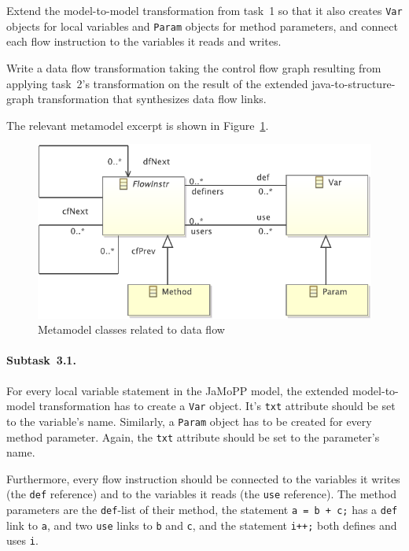 \documentclass[11pt]{article}
\begin{document}
\begin{compactenum}
\item Extend the model-to-model transformation from task~1 so that it also
  creates \verb|Var| objects for local variables and \verb|Param| objects for
  method parameters, and connect each flow instruction to the variables it
  reads and writes.
\item Write a data flow transformation taking the control flow graph resulting
  from applying task~2's transformation on the result of the extended
  java-to-structure-graph transformation that synthesizes data flow links.
\end{compactenum}

The relevant metamodel excerpt is shown in Figure~\ref{fig:data-flow-mm}.

\begin{figure}[h!]
  \centering
  \includegraphics[width=0.6\linewidth]{../metamodel/DataFlowGraph}
  \caption{Metamodel classes related to data flow}
  \label{fig:data-flow-mm}
\end{figure}

\paragraph{Subtask~3.1.}
\label{sec:subtask-3.1}

For every local variable statement in the JaMoPP model, the extended
model-to-model transformation has to create a \verb|Var| object.  It's
\verb|txt| attribute should be set to the variable's name.  Similarly, a
\verb|Param| object has to be created for every method parameter.  Again, the
\verb|txt| attribute should be set to the parameter's name.

Furthermore, every flow instruction should be connected to the variables it
writes (the \verb|def| reference) and to the variables it reads (the \verb|use|
reference).  The method parameters are the \verb|def|-list of their method, the
statement \verb|a = b + c;| has a \verb|def| link to \verb|a|, and two
\verb|use| links to \verb|b| and \verb|c|, and the statement \verb|i++;| both
defines and uses \verb|i|.
\end{document}

